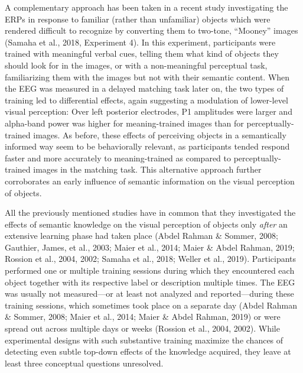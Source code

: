 \documentclass[
  english,
  doc,12pt,twoside,floatsintext]{apa7}
\begin{document}
A complementary approach has been taken in a recent study investigating the ERPs in response to familiar (rather than unfamiliar) objects which were rendered difficult to recognize by converting them to two-tone, ``Mooney'' images (Samaha et al., 2018, Experiment 4). In this experiment, participants were trained with meaningful verbal cues, telling them what kind of objects they should look for in the images, or with a non-meaningful perceptual task, familiarizing them with the images but not with their semantic content. When the EEG was measured in a delayed matching task later on, the two types of training led to differential effects, again suggesting a modulation of lower-level visual perception: Over left posterior electrodes, P1 amplitudes were larger and alpha-band power was higher for meaning-trained images than for perceptually-trained images. As before, these effects of perceiving objects in a semantically informed way seem to be behaviorally relevant, as participants tended respond faster and more accurately to meaning-trained as compared to perceptually-trained images in the matching task. This alternative approach further corroborates an early influence of semantic information on the visual perception of objects.

All the previously mentioned studies have in common that they investigated the effects of semantic knowledge on the visual perception of objects only \emph{after} an extensive learning phase had taken place (Abdel Rahman \& Sommer, 2008; Gauthier, James, et al., 2003; Maier et al., 2014; Maier \& Abdel Rahman, 2019; Rossion et al., 2004, 2002; Samaha et al., 2018; Weller et al., 2019). Participants performed one or multiple training sessions during which they encountered each object together with its respective label or description multiple times. The EEG was usually not measured---or at least not analyzed and reported---during these training sessions, which sometimes took place on a separate day (Abdel Rahman \& Sommer, 2008; Maier et al., 2014; Maier \& Abdel Rahman, 2019) or were spread out across multiple days or weeks (Rossion et al., 2004, 2002). While experimental designs with such substantive training maximize the chances of detecting even subtle top-down effects of the knowledge acquired, they leave at least three conceptual questions unresolved.
\end{document}
